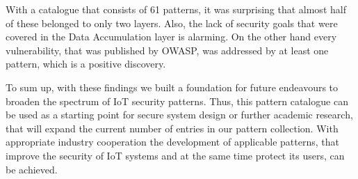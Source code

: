 With a catalogue that consists of 61 patterns, it was surprising that almost half of these belonged to only two layers. Also, the lack of security goals that were covered in the Data Accumulation layer is alarming. On the other hand every vulnerability, that was published by OWASP, was addressed by at least one pattern, which is a positive discovery. 

To sum up, with these findings we built a foundation for future endeavours to broaden the spectrum of IoT security patterns. Thus, this pattern catalogue can be used as a starting point for secure system design or further academic research, that will expand the current number of entries in our pattern collection. With appropriate industry cooperation the development of applicable patterns, that improve the security of IoT systems and at the same time protect its users, can be achieved.

